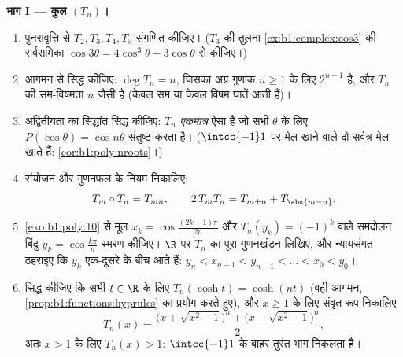 \begin{problem}
\medskip \noindent\textbf{भाग I --- कुल $(T_n)$।}
\begin{enumerate}
  \item पुनरावृत्ति से $T_2, T_3, T_4, T_5$ संगणित कीजिए। ($T_3$ की तुलना
  \cref{ex:b1:complex:cos3} की सर्वसमिका $\cos3\theta = 4\cos^3\theta -
  3\cos\theta$ से कीजिए।)
  \item आगमन से सिद्ध कीजिए: $\deg T_n = n$, जिसका अग्र गुणांक $n \geq 1$ के
  लिए $2^{n-1}$ है, और $T_n$ की सम-विषमता $n$ जैसी है (केवल सम या केवल विषम
  घातें आती हैं)।
  \item अद्वितीयता का सिद्धांत सिद्ध कीजिए: $T_n$ \emph{एकमात्र} ऐसा 
  है जो सभी $\theta$ के लिए $P(\cos\theta) = \cos n\theta$ संतुष्ट करता है।
  ($\intcc{-1}1$ पर मेल खाने वाले दो  सर्वत्र मेल खाते हैं:
  \cref{cor:b1:poly:nroots}।)
  \item संयोजन और गुणनफल के नियम निकालिए:
        \[
        T_m \circ T_n = T_{mn},
        \qquad
        2\,T_m T_n = T_{m+n} + T_{\abs{m-n}} .
        \]
  \item \cref{exo:b1:poly:10} से मूल $x_k = \cos\frac{(2k+1)\pi}{2n}$ और
  $T_n(y_k) = (-1)^k$ वाले समदोलन बिंदु $y_k = \cos\frac{k\pi}n$ स्मरण
  कीजिए। $\R$ पर $T_n$ का पूरा गुणनखंडन लिखिए, और न्यायसंगत ठहराइए कि $y_k$
  एक-दूसरे के बीच आते हैं: $y_n < x_{n-1} < y_{n-1} < \dots < x_0 < y_0$।
  \item सिद्ध कीजिए कि सभी $t \in \R$ के लिए $T_n(\cosh t) = \cosh(nt)$ (वही
  आगमन, \cref{prop:b1:functions:hyprules} का प्रयोग करते हुए), और $x \geq 1$
  के लिए संवृत रूप निकालिए
        \[
        T_n(x) = \frac{\bigl(x + \sqrt{x^2 - 1}\bigr)^n +
        \bigl(x - \sqrt{x^2 - 1}\bigr)^n}{2} ,
        \]
        अतः $x > 1$ के लिए $T_n(x) > 1$: $\intcc{-1}1$ के बाहर  तुरंत
        भाग निकलता है।
\end{enumerate}


\end{problem}

